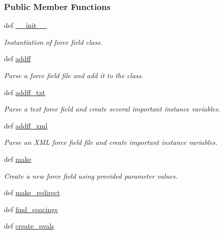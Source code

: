 \subsubsection*{\-Public \-Member \-Functions}
\begin{DoxyCompactItemize}
\item 
def \hyperlink{classforcebalance_1_1forcefield_1_1FF_aef2e183571128eea70132c7be2a8dc5d}{\-\_\-\-\_\-init\-\_\-\-\_\-}
\begin{DoxyCompactList}\small\item\em \-Instantiation of force field class. \end{DoxyCompactList}\item 
def \hyperlink{classforcebalance_1_1forcefield_1_1FF_a142d41c86b9b0ef57f93ec6fb349357b}{addff}
\begin{DoxyCompactList}\small\item\em \-Parse a force field file and add it to the class. \end{DoxyCompactList}\item 
def \hyperlink{classforcebalance_1_1forcefield_1_1FF_ab4b5d5b79c89ab618ae968348bdfda3a}{addff\-\_\-txt}
\begin{DoxyCompactList}\small\item\em \-Parse a text force field and create several important instance variables. \end{DoxyCompactList}\item 
def \hyperlink{classforcebalance_1_1forcefield_1_1FF_aaed8b2b725141c301f58016c80acec27}{addff\-\_\-xml}
\begin{DoxyCompactList}\small\item\em \-Parse an \-X\-M\-L force field file and create important instance variables. \end{DoxyCompactList}\item 
def \hyperlink{classforcebalance_1_1forcefield_1_1FF_aecd595ddb369aedd7009e6756276ffc5}{make}
\begin{DoxyCompactList}\small\item\em \-Create a new force field using provided parameter values. \end{DoxyCompactList}\item 
def \hyperlink{classforcebalance_1_1forcefield_1_1FF_a0540c3df2c0dece9f2711cc04fd958d4}{make\-\_\-redirect}
\item 
def \hyperlink{classforcebalance_1_1forcefield_1_1FF_a2515e2361eb460edeab69f3d7742d3d9}{find\-\_\-spacings}
\item 
def \hyperlink{classforcebalance_1_1forcefield_1_1FF_a260031479e0429e497f56987de541930}{create\-\_\-pvals}

\end{DoxyCompactItemize}
